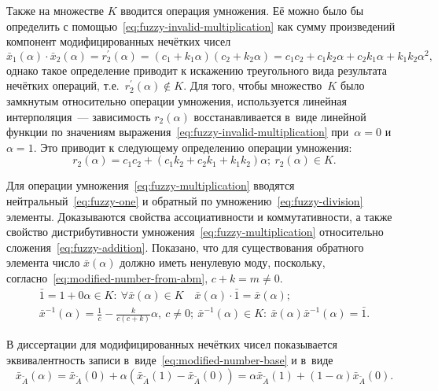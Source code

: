 Также на множестве $K$ вводится операция умножения. Её можно было бы определить с помощью~\eqref{eq:fuzzy-invalid-multiplication} как сумму произведений компонент модифицированных нечётких чисел
\begin{equation}
\label{eq:fuzzy-invalid-multiplication}
  \bar{x}_1(\alpha )\cdot \bar{x}_2(\alpha )=r_{2}^{'}\left( \alpha  \right)=\left( c_1+k_1\alpha  \right)\left( c_2+k_2\alpha \right)= c_1 c_2+c_1 k_2\alpha+c_2 k_1\alpha+k_1 k_2\alpha^2,
\end{equation}
однако такое определение приводит к искажению треугольного вида результата нечётких операций, т.е.~$r_{2}^{'}\left( \alpha  \right)\notin K$. Для того, чтобы множество~$K$ было замкнутым относительно операции умножения, используется линейная интерполяция~--- зависимость $r_2\left(\alpha \right)$ восстанавливается в~виде линейной функции по значениям выражения~\eqref{eq:fuzzy-invalid-multiplication} при~$\alpha =0$ и~$\alpha=1$. Это приводит к следующему определению операции умножения:
\begin{equation}
\label{eq:fuzzy-multiplication}
  r_2\left( \alpha \right)=c_1 c_2+\left(c_1 k_2+ c_2 k_1 +k_1 k_2 \right)\alpha;\ r_2\left( \alpha  \right)\in K.
\end{equation}

Для операции умножения~\eqref{eq:fuzzy-multiplication} вводятся нейтральный~\eqref{eq:fuzzy-one} и обратный по умножению~\eqref{eq:fuzzy-division} элементы. Доказываются свойства ассоциативности и коммутативности, а также свойство дистрибутивности умножения~\eqref{eq:fuzzy-multiplication} относительно сложения~\eqref{eq:fuzzy-addition}. Показано, что для существования обратного элемента число $\bar{x}\left( \alpha  \right)$ должно иметь ненулевую моду, поскольку, согласно~\eqref{eq:modified-number-from-abm}, $c+k=m\ne 0$.
\begin{gather}
  \label{eq:fuzzy-one}
  \bar{1}=1+0\alpha \in K:\ \forall \bar{x}\left( \alpha  \right)\in K\quad \bar{x}\left( \alpha  \right)\cdot \bar{1}=\bar{x}\left( \alpha  \right); \\
  \label{eq:fuzzy-division}
  \bar{x}^{-1}(\alpha )=\frac{1}{c}-\frac{k}{c\left(c+k\right)}\alpha,\ c\ne 0;\ \bar{x}^{-1}(\alpha ) \in K:\ \bar{x}\left(\alpha \right){{\bar{x}}^{-1}}\left( \alpha  \right)=\bar{1}.
\end{gather}

В диссертации для модифицированных нечётких чисел показывается эквивалентность записи в~виде~\eqref{eq:modified-number-base} и в~виде
\begin{equation}
\label{eq:isomorphic-field}
  \bar{x}_{\tilde A}\left( \alpha \right)=\bar{x}_{\tilde A}\left( 0 \right)+\alpha \left(\bar{x}_{\tilde A}\left( 1 \right)-\bar{x}_{\tilde A}\left(0 \right) \right)=\alpha \bar{x}_{\tilde A}\left( 1 \right)+\left( 1-\alpha  \right) \bar{x}_{\tilde A}\left( 0 \right).
\end{equation}

